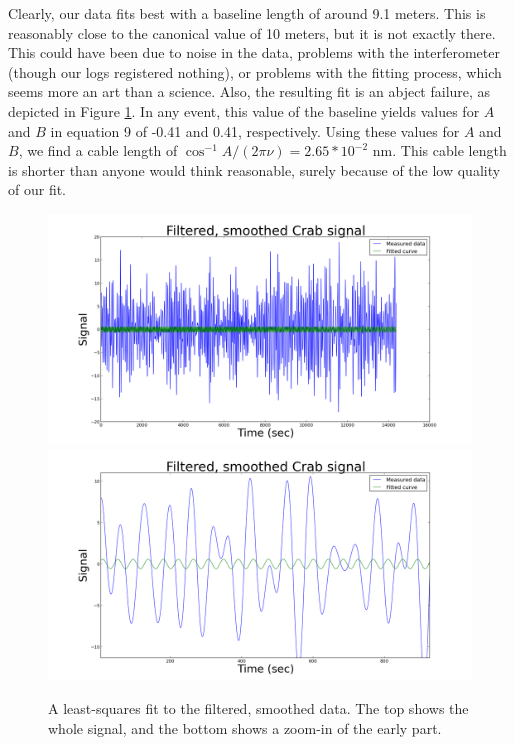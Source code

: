 \documentclass[11pt]{article}
\newcommand{\inv}{^{-1}}
\begin{document}
Clearly, our data fits best with a baseline length of around 9.1 meters. This is reasonably close to the canonical value of 10 meters, but it is not exactly there. This could have been due to noise in the data, problems with the interferometer (though our logs registered nothing), or problems with the fitting process, which seems more an art than a science. Also, the resulting fit is an abject failure, as depicted in Figure \ref{failure}. In any event, this value of the baseline yields values for $A$ and $B$ in equation 9 of -0.41 and 0.41, respectively. Using these values for $A$ and $B$, we find a cable length of $\cos\inv {A}  / (2 \pi\nu) = 2.65 * 10^{-2}$ nm. This cable length is shorter than anyone would think reasonable, surely because of the low quality of our fit. 

\begin{figure}
\centering
\includegraphics[scale=0.35]{garphs/failure}
\includegraphics[scale=0.35]{garphs/failurezoom}
\caption{ A least-squares fit to the filtered, smoothed data. The top shows the whole signal, and the bottom shows a zoom-in of the early part. \label{failure}}
\end{figure}
\end{document}
